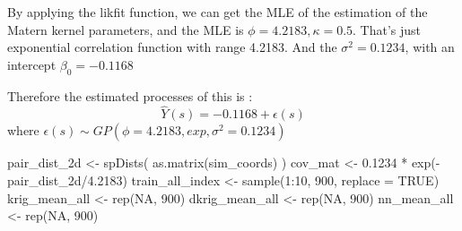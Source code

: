 \documentclass[
]{article}
\newenvironment{Shaded}{\begin{snugshade}}{\end{snugshade}}
\newcommand{\AttributeTok}[1]{\textcolor[rgb]{0.77,0.63,0.00}{#1}}
\newcommand{\ConstantTok}[1]{\textcolor[rgb]{0.00,0.00,0.00}{#1}}
\newcommand{\DecValTok}[1]{\textcolor[rgb]{0.00,0.00,0.81}{#1}}
\newcommand{\FloatTok}[1]{\textcolor[rgb]{0.00,0.00,0.81}{#1}}
\newcommand{\FunctionTok}[1]{\textcolor[rgb]{0.00,0.00,0.00}{#1}}
\newcommand{\NormalTok}[1]{#1}
\newcommand{\OtherTok}[1]{\textcolor[rgb]{0.56,0.35,0.01}{#1}}
\newcommand{\SpecialCharTok}[1]{\textcolor[rgb]{0.00,0.00,0.00}{#1}}
\begin{document}
By applying the likfit function, we can get the MLE of the estimation of
the Matern kernel parameters, and the MLE is
\(\phi = 4.2183, \kappa=0.5\). That's just exponential correlation
function with range 4.2183. And the \(\sigma^2=0.1234\), with an
intercept \(\beta_0 = -0.1168\)

Therefore the estimated processes of this is :
\[\hat{Y}(s) = -0.1168 + \epsilon(s)\] where
\(\epsilon(s) \sim GP(\phi = 4.2183, exp, \sigma^2 = 0.1234)\)

\begin{Shaded}
\begin{Highlighting}[]
\NormalTok{pair\_dist\_2d }\OtherTok{\textless{}{-}} \FunctionTok{spDists}\NormalTok{( }\FunctionTok{as.matrix}\NormalTok{(sim\_coords) )}
\NormalTok{cov\_mat }\OtherTok{\textless{}{-}} \FloatTok{0.1234} \SpecialCharTok{*} \FunctionTok{exp}\NormalTok{(}\SpecialCharTok{{-}}\NormalTok{pair\_dist\_2d}\SpecialCharTok{/}\FloatTok{4.2183}\NormalTok{)}
\NormalTok{train\_all\_index }\OtherTok{\textless{}{-}} \FunctionTok{sample}\NormalTok{(}\DecValTok{1}\SpecialCharTok{:}\DecValTok{10}\NormalTok{, }\DecValTok{900}\NormalTok{, }\AttributeTok{replace =} \ConstantTok{TRUE}\NormalTok{)}
\NormalTok{krig\_mean\_all }\OtherTok{\textless{}{-}} \FunctionTok{rep}\NormalTok{(}\ConstantTok{NA}\NormalTok{, }\DecValTok{900}\NormalTok{)}
\NormalTok{dkrig\_mean\_all }\OtherTok{\textless{}{-}} \FunctionTok{rep}\NormalTok{(}\ConstantTok{NA}\NormalTok{, }\DecValTok{900}\NormalTok{)}
\NormalTok{nn\_mean\_all }\OtherTok{\textless{}{-}} \FunctionTok{rep}\NormalTok{(}\ConstantTok{NA}\NormalTok{, }\DecValTok{900}\NormalTok{)}
\end{Highlighting}
\end{Shaded}
\end{document}
